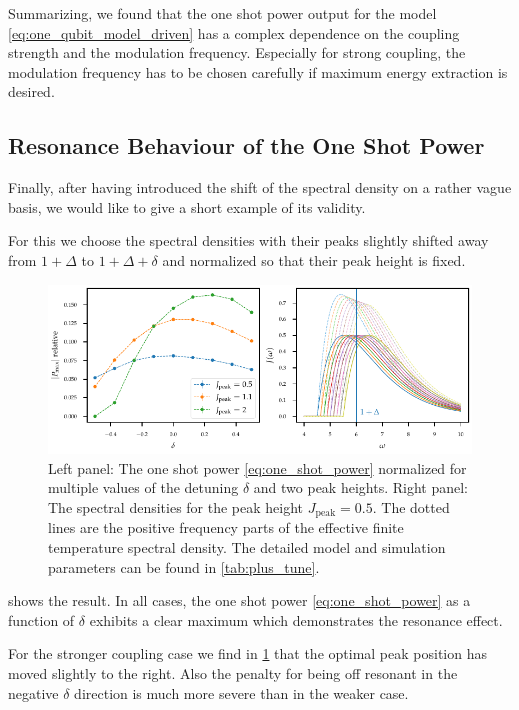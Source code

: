 Summarizing, we found that the one shot power output for the model
\cref{eq:one_qubit_model_driven} has a complex dependence on the
coupling strength and the modulation frequency. Especially for strong
coupling, the modulation frequency has to be chosen carefully if
maximum energy extraction is desired.

\subsection{Resonance Behaviour of the One Shot Power}
\label{sec:modcoup_reso}

Finally, after having introduced the shift of the spectral density on
a rather vague basis, we would like to give a short example of its
validity.

For this we choose the spectral densities with their peaks slightly
shifted away from \(1+Δ\) to \(1+Δ+δ\) and normalized so that their
peak height is fixed.
\begin{figure}[htb]
  \centering
  \includegraphics{figs/one_bath_mod/modulation_tuning}
  \caption{\label{fig:modulation_tuning} Left panel: The one shot
    power \cref{eq:one_shot_power} normalized for multiple values of
    the detuning \(δ\) and two peak heights. Right panel: The spectral
    densities for the peak height \(J_{\mathrm{peak}} = 0.5\). The
    dotted lines are the positive frequency parts of the effective
    finite temperature spectral density. The detailed model and
    simulation parameters can be found in \cref{tab:plus_tune}.}
\end{figure}

 shows the result. In all cases, the one
shot power \cref{eq:one_shot_power} as a function of \(δ\) exhibits a
clear maximum which demonstrates the resonance effect.

For the stronger coupling case we find in \cref{fig:modulation_tuning}
that the optimal peak position has moved slightly to the right.
Also the penalty for being off resonant in the negative \(δ\)
direction is much more severe than in the weaker case.


